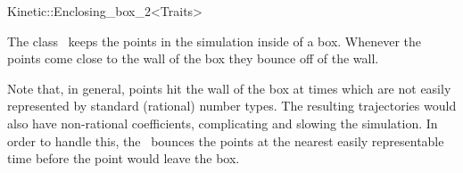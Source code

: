 

\begin{ccRefClass}{Kinetic::Enclosing_box_2<Traits>}  %


\ccDefinition
  
The class \ccRefName\ keeps the points in the simulation inside of a
box. Whenever the points come close to the wall of the box they bounce off of the wall.

Note that, in general, points hit the wall of the box at times which
are not easily represented by standard (rational) number types. The
resulting trajectories would also have non-rational coefficients,
complicating and slowing the simulation. In order to handle this, the
\ccRefName\ bounces the points at the nearest easily representable
time before the point would leave the box.


\ccTypes


\ccCreation
{}  %




\end{ccRefClass}



